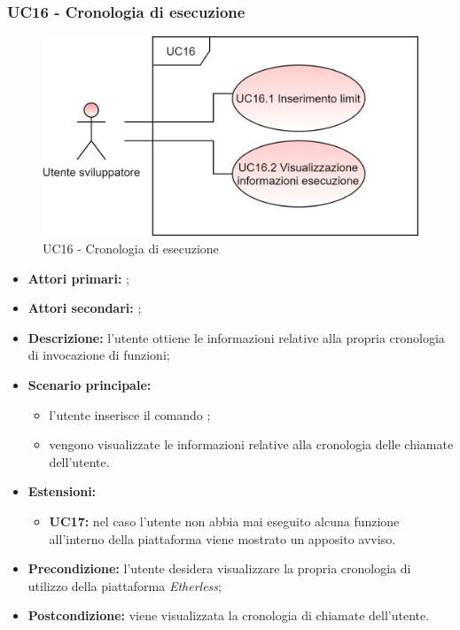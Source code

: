 \subsubsection{UC16 - Cronologia di esecuzione}
\begin{figure}[H]
	\centering
	\includegraphics[scale=\ucs]{./res/img/UC16.png}
	\caption {UC16 - Cronologia di esecuzione}
\end{figure}
\begin{itemize}
	\item \textbf{Attori primari:} \us{};
	\item \textbf{Attori secondari:} \re{};
	\item \textbf{Descrizione:} l’utente ottiene le informazioni relative alla propria cronologia di invocazione di funzioni;
	\item \textbf{Scenario principale:} 
	\begin{itemize}
		\item l'utente inserisce il comando \history;  
		\item vengono visualizzate le informazioni relative alla cronologia delle chiamate dell’utente.
	\end{itemize}
	\item \textbf{Estensioni:} 
	\begin{itemize}
		\item \textbf{UC17:} nel caso l’utente non abbia mai eseguito alcuna funzione all’interno della piattaforma viene mostrato un apposito avviso.  
	\end{itemize}
	\item \textbf{Precondizione:} l’utente desidera visualizzare la propria cronologia di utilizzo della piattaforma \textit{Etherless}; 
	\item \textbf{Postcondizione:} viene visualizzata la cronologia di chiamate dell’utente.  
\end{itemize}